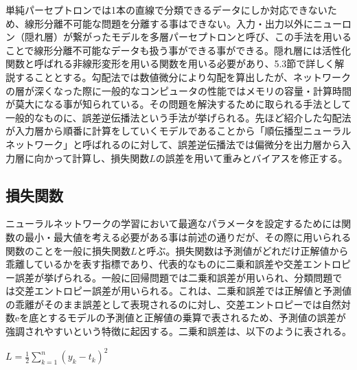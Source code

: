 \documentclass{article}
\begin{document}
単純パーセプトロンでは1本の直線で分類できるデータにしか対応できないため、線形分離不可能な問題を分離する事はできない。入力・出力以外にニューロン（隠れ層）が繋がったモデルを多層パーセプトロンと呼び、この手法を用いることで線形分離不可能なデータも扱う事ができる事ができる。隠れ層には活性化関数と呼ばれる非線形変形を用いる関数を用いる必要があり、5.3節で詳しく解説することとする。勾配法では数値微分により勾配を算出したが、ネットワークの層が深くなった際に一般的なコンピュータの性能ではメモリの容量・計算時間が莫大になる事が知られている。その問題を解決するために取られる手法として一般的なものに、誤差逆伝播法という手法が挙げられる。先ほど紹介した勾配法が入力層から順番に計算をしていくモデルであることから「順伝播型ニューラルネットワーク」と呼ばれるのに対して、誤差逆伝播法では偏微分を出力層から入力層に向かって計算し、損失関数\begin{math}L\end{math}の誤差を用いて重みとバイアスを修正する。




\subsection{損失関数}

ニューラルネットワークの学習において最適なパラメータを設定するためには関数の最小・最大値を考える必要がある事は前述の通りだが、その際に用いられる関数のことを一般に損失関数\begin{math}L\end{math}と呼ぶ。損失関数は予測値がどれだけ正解値から乖離しているかを表す指標であり、代表的なものに二乗和誤差や交差エントロピー誤差が挙げられる。一般に回帰問題では二乗和誤差が用いられ、分類問題では交差エントロピー誤差が用いられる。これは、二乗和誤差では正解値と予測値の乖離がそのまま誤差として表現されるのに対し、交差エントロピーでは自然対数eを底とするモデルの予測値と正解値の乗算で表されるため、予測値の誤差が強調されやすいという特徴に起因する。二乗和誤差は、以下のように表される。


\begin{center}
\begin{math}
L = \frac{1}{2} \sum_{k=1}^{n} (y_k - t_k)^{2}
\end{math}
\end{center}
\end{document}
